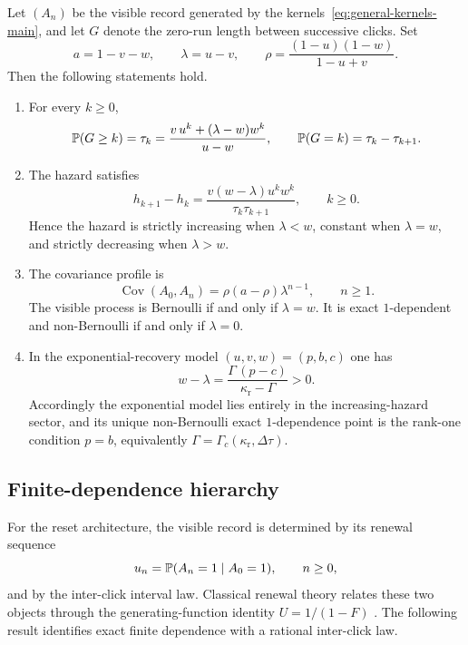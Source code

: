 \begin{theorem}\label{thm:two-state-class-main}
Let $(A_n)$ be the visible record generated by the kernels~\eqref{eq:general-kernels-main}, and let $G$ denote the zero-run length between successive clicks. Set
\[
a=1-v-w,\qquad \lambda=u-v,\qquad \rho=\frac{(1-u)(1-w)}{1-u+v}.
\]
Then the following statements hold.
\begin{enumerate}[label=\textup{(\roman*)},leftmargin=2.2em,itemsep=0.25em]
\item For every $k\ge0$,
\begin{equation}\label{eq:general-tail-main}
\mathbb{P}(G\ge k)=\tau_k=\frac{v\,u^k+(\lambda-w)w^k}{u-w},
\qquad
\mathbb{P}(G=k)=\tau_k-\tau_{k+1}.
\end{equation}
\item The hazard satisfies
\begin{equation}\label{eq:general-hazard-diff-main}
h_{k+1}-h_k=
\frac{v(w-\lambda)u^k w^k}{\tau_k\tau_{k+1}},
\qquad k\ge0.
\end{equation}
Hence the hazard is strictly increasing when $\lambda<w$, constant when $\lambda=w$, and strictly decreasing when $\lambda>w$.
\item The covariance profile is
\begin{equation}\label{eq:general-cov-main}
\operatorname{Cov}(A_0,A_n)=\rho(a-\rho)\lambda^{n-1},
\qquad n\ge1.
\end{equation}
The visible process is Bernoulli if and only if $\lambda=w$. It is exact $1$-dependent and non-Bernoulli if and only if $\lambda=0$.
\item In the exponential-recovery model $(u,v,w)=(p,b,c)$ one has
\begin{equation}\label{eq:general-specialization-main}
w-\lambda=\frac{\Gamma\,(p-c)}{\kappa_{\mathrm r}-\Gamma}>0.
\end{equation}
Accordingly the exponential model lies entirely in the increasing-hazard sector, and its unique non-Bernoulli exact $1$-dependence point is the rank-one condition $p=b$, equivalently $\Gamma=\Gamma_c(\kappa_{\mathrm r},\Delta\tau)$.
\end{enumerate}
\end{theorem}

\subsection{Finite-dependence hierarchy}\label{app:renewal-hierarchy-app}

For the reset architecture, the visible record is determined by its renewal sequence
\[
u_n=\mathbb{P}(A_n=1\mid A_0=1),\qquad n\ge0,
\]
and by the inter-click interval law. Classical renewal theory relates these two objects through the generating-function identity $U=1/(1-F)$ \cite{Cinlar1975}. The following result identifies exact finite dependence with a rational inter-click law.

